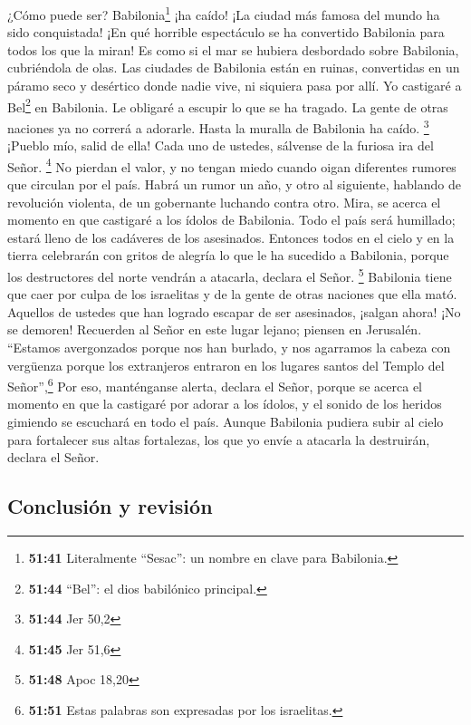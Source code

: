  ¿Cómo puede ser? Babilonia\footnote{\textbf{51:41}
  Literalmente ``Sesac'': un nombre en clave para Babilonia.} ¡ha caído!
¡La ciudad más famosa del mundo ha sido conquistada! ¡En qué horrible
espectáculo se ha convertido Babilonia para todos los que la miran!
 Es como si el mar se hubiera desbordado sobre Babilonia,
cubriéndola de olas.  Las ciudades de Babilonia están en
ruinas, convertidas en un páramo seco y desértico donde nadie vive, ni
siquiera pasa por allí.  Yo castigaré a Bel\footnote{\textbf{51:44}
  ``Bel'': el dios babilónico principal.} en Babilonia. Le obligaré a
escupir lo que se ha tragado. La gente de otras naciones ya no correrá a
adorarle. Hasta la muralla de Babilonia ha caído. \footnote{\textbf{51:44}
  Jer 50,2}  ¡Pueblo mío, salid de ella! Cada uno de
ustedes, sálvense de la furiosa ira del Señor. \footnote{\textbf{51:45}
  Jer 51,6}  No pierdan el valor, y no tengan miedo
cuando oigan diferentes rumores que circulan por el país. Habrá un rumor
un año, y otro al siguiente, hablando de revolución violenta, de un
gobernante luchando contra otro.  Mira, se acerca el
momento en que castigaré a los ídolos de Babilonia. Todo el país será
humillado; estará lleno de los cadáveres de los asesinados.
 Entonces todos en el cielo y en la tierra celebrarán con
gritos de alegría lo que le ha sucedido a Babilonia, porque los
destructores del norte vendrán a atacarla, declara el Señor. \footnote{\textbf{51:48}
  Apoc 18,20}  Babilonia tiene que caer por culpa de los
israelitas y de la gente de otras naciones que ella mató.
 Aquellos de ustedes que han logrado escapar de ser
asesinados, ¡salgan ahora! ¡No se demoren! Recuerden al Señor en este
lugar lejano; piensen en Jerusalén.  ``Estamos
avergonzados porque nos han burlado, y nos agarramos la cabeza con
vergüenza porque los extranjeros entraron en los lugares santos del
Templo del Señor'',\footnote{\textbf{51:51} Estas palabras son
  expresadas por los israelitas.}  Por eso, manténganse
alerta, declara el Señor, porque se acerca el momento en que la
castigaré por adorar a los ídolos, y el sonido de los heridos gimiendo
se escuchará en todo el país.  Aunque Babilonia pudiera
subir al cielo para fortalecer sus altas fortalezas, los que yo envíe a
atacarla la destruirán, declara el Señor.

\hypertarget{conclusiuxf3n-y-revisiuxf3n}{%
\subsection{Conclusión y revisión}\label{conclusiuxf3n-y-revisiuxf3n}}

